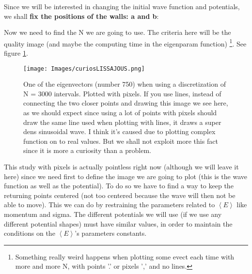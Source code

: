 \documentclass{article}
\begin{document}
\begin{itemize}
Since we will be interested in changing the initial wave function and potentials, we shall \textbf{fix the positions of the walls: a and b}:

\begin{center}
\end{center}

Now we need to find the N we are going to use. The criteria here will be the quality image (and maybe the computing time in the eigenparam function) \footnote{Something really weird happens when plotting some evect each time with more and more N, with points '.' or pixels ',' and no lines.}. See figure \ref{fig:curiosLISSAJ}.
\begin{figure}[H]
	\centering
	\texttt{[image: Images/curiosLISSAJOUS.png]}
	\captionsetup{justification = centering, 
		width = 0.9\textwidth}
	\caption{One of the eigenvectors (number 750) when using a discretization of N = 3000 intervals. Plotted with pixels. If you use lines, instead of connecting the two closer points and drawing this image we see here, as we should expect since using a lot of points with pixels should draw the same line used when plotting with lines, it draws a super dens sinusoidal wave. I think it's caused due to plotting complex function on to real values. But we shall not exploit more this fact since it is more a curiosity than a problem.}
	\label{fig:curiosLISSAJ}
\end{figure}

This study with pixels is actually pointless right now (although we will leave it here) since we need first to define the image we are going to plot (this is the wave function as well as the potential). To do so we have to find a way to keep the returning points centered (not too centered because the wave will then not be able to move). This we can do by restraining the parameters related to $\left\langle E \right\rangle$ like momentum and sigma. The different potentials we will use (if we use any different potential shapes) must have similar values, in order to maintain the conditions on the $\left\langle E \right\rangle$'s parameters constants.
\end{itemize}
\end{document}
